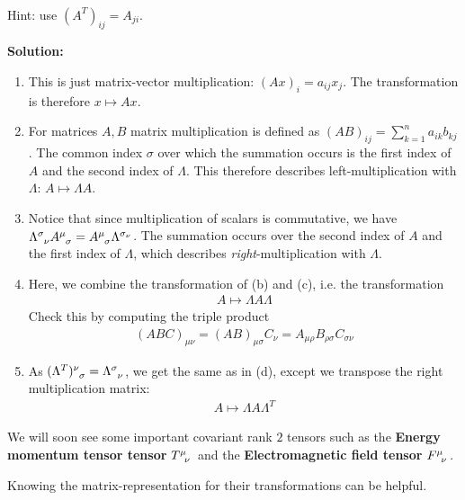 \begin{ex}[]
\begin{enumerate}
\begin{align*}
      \end{align*}
      Hint: use $(A^{T})_{ij} = A_{ji}$.
  \end{enumerate}
  \textbf{Solution:}
  \begin{enumerate}
    \item This is just matrix-vector multiplication: $(Ax)_{i} = a_{ij}x_j$. The transformation is therefore $x \mapsto Ax$.
    \item For matrices $A,B$ matrix multiplication is defined as $(AB)_{ij} = \sum_{k=1}^{n}a_{ik}b_{kj}$.
      The common index $\sigma$ over which the summation occurs is the first index of $A$ and the second index of $\Lambda$. 
      This therefore describes left-multiplication with $\Lambda$: $A \mapsto \Lambda A$.
    \item Notice that since multiplication of scalars is commutative, we have $\tensor{\Lambda}{^\sigma_{\nu}} \tensor{A}{^{\mu}_\sigma} = \tensor{A}{^{\mu}_\sigma} \tensor{\Lambda}{^{\sigma_{\nu}}}$.
      The summation occurs over the second index of $A$ and the first index of $\Lambda$, which describes \emph{right}-multiplication with $\Lambda$.

    \item Here, we combine the transformation of (b) and (c), i.e. the transformation
      \begin{align*}
        A \mapsto \Lambda A \Lambda
      \end{align*}
      Check this by computing the triple product
      \begin{align*}
        (ABC)_{\mu \nu} = (AB)_{\mu \sigma} C_{\nu} = A_{\mu \rho} B_{\rho \sigma} C_{\sigma \nu}
      \end{align*}
    \item As $\tensor{(\Lambda^{T})}{^\nu_\sigma} =  \tensor{\Lambda}{^{\sigma}_{\nu}}$, we get the same as in (d), except we transpose the right multiplication matrix:
      \begin{align*}
        A \mapsto \Lambda A \Lambda^{T}
      \end{align*}
  \end{enumerate}

  We will soon see some important covariant rank $2$ tensors such as the \textbf{Energy momentum tensor tensor} $\tensor{T}{^\mu_\nu}$ and the \textbf{Electromagnetic field tensor} $\tensor{F}{^\mu_\nu}$.

  Knowing the matrix-representation for their transformations can be helpful.
\end{ex}
